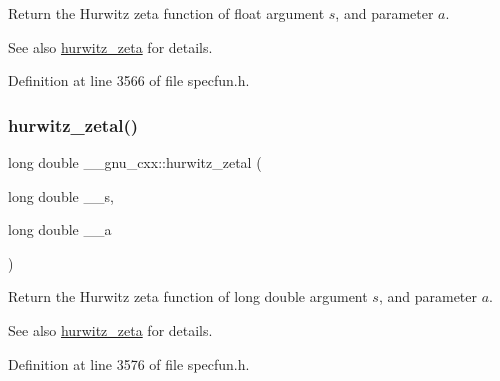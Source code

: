 Return the Hurwitz zeta function of {\ttfamily float} argument $ s $, and parameter $ a $.

\begin{DoxySeeAlso}{See also}
\hyperlink{group__gnu__math__spec__func_ga7b167ce1c8d9aa6aad40fc83a95733bd}{hurwitz\+\_\+zeta} for details. 
\end{DoxySeeAlso}


Definition at line 3566 of file specfun.\+h.

\mbox{\label{group__gnu__math__spec__func_gad8f2cfc7e198755968bae35d46b49d5a}} 
\subsubsection{\texorpdfstring{hurwitz\+\_\+zetal()}{hurwitz\_zetal()}}
{\footnotesize\ttfamily long double \+\_\+\+\_\+gnu\+\_\+cxx\+::hurwitz\+\_\+zetal (\begin{DoxyParamCaption}\item[{long double}]{\+\_\+\+\_\+s,  }\item[{long double}]{\+\_\+\+\_\+a }\end{DoxyParamCaption})\hspace{0.3cm}{\ttfamily [inline]}}

Return the Hurwitz zeta function of {\ttfamily long double} argument $ s $, and parameter $ a $.

\begin{DoxySeeAlso}{See also}
\hyperlink{group__gnu__math__spec__func_ga7b167ce1c8d9aa6aad40fc83a95733bd}{hurwitz\+\_\+zeta} for details. 
\end{DoxySeeAlso}


Definition at line 3576 of file specfun.\+h.

\mbox{\label{group__gnu__math__spec__func_ga374198e4076f9e23f3878ca3af70e6da}} 

